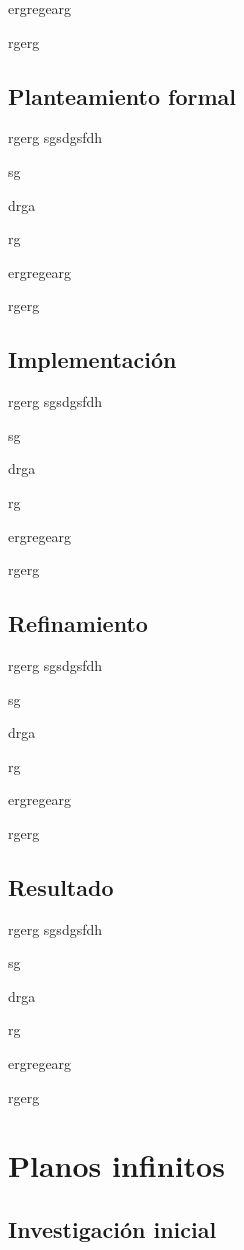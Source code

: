 ergregearg

rgerg

\subsection{Planteamiento formal}

rgerg
sgsdgsfdh

sg

drga

rg

ergregearg

rgerg

\subsection{Implementación}

rgerg
sgsdgsfdh

sg

drga

rg

ergregearg

rgerg

\subsection{Refinamiento}

rgerg
sgsdgsfdh

sg

drga

rg

ergregearg

rgerg

\subsection{Resultado}

rgerg
sgsdgsfdh

sg

drga

rg

ergregearg

rgerg


\section{Planos infinitos}

\subsection{Investigación inicial}

